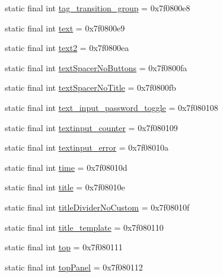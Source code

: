 \begin{DoxyCompactItemize}
\item 
static final int \mbox{\hyperlink{classandroid_1_1support_1_1design_1_1_r_1_1id_addf740e3527475a3849728232f72806a}{tag\+\_\+transition\+\_\+group}} = 0x7f0800e8
\item 
static final int \mbox{\hyperlink{classandroid_1_1support_1_1design_1_1_r_1_1id_a42faaf7f13a49213f874ef8cb4e68ee1}{text}} = 0x7f0800e9
\item 
static final int \mbox{\hyperlink{classandroid_1_1support_1_1design_1_1_r_1_1id_a65e945658c4131f7246b3447a632bccf}{text2}} = 0x7f0800ea
\item 
static final int \mbox{\hyperlink{classandroid_1_1support_1_1design_1_1_r_1_1id_a56c833c59cf9349be24f83f9e9dea560}{text\+Spacer\+No\+Buttons}} = 0x7f0800fa
\item 
static final int \mbox{\hyperlink{classandroid_1_1support_1_1design_1_1_r_1_1id_ac4df85eb99a5c88371d15995269b0cd6}{text\+Spacer\+No\+Title}} = 0x7f0800fb
\item 
static final int \mbox{\hyperlink{classandroid_1_1support_1_1design_1_1_r_1_1id_a77c3ac2414c276faa7936afbef217ab0}{text\+\_\+input\+\_\+password\+\_\+toggle}} = 0x7f080108
\item 
static final int \mbox{\hyperlink{classandroid_1_1support_1_1design_1_1_r_1_1id_a3e209a8a91205164870a6a2004def118}{textinput\+\_\+counter}} = 0x7f080109
\item 
static final int \mbox{\hyperlink{classandroid_1_1support_1_1design_1_1_r_1_1id_a2f78eeb6c053613a83de5e30874f4842}{textinput\+\_\+error}} = 0x7f08010a
\item 
static final int \mbox{\hyperlink{classandroid_1_1support_1_1design_1_1_r_1_1id_ab05973571013eeb8a42479f708d42317}{time}} = 0x7f08010d
\item 
static final int \mbox{\hyperlink{classandroid_1_1support_1_1design_1_1_r_1_1id_a15e74af9346f557351ae9e43a3ab4da1}{title}} = 0x7f08010e
\item 
static final int \mbox{\hyperlink{classandroid_1_1support_1_1design_1_1_r_1_1id_a3685419c81ad5d66fb1cef37917b8008}{title\+Divider\+No\+Custom}} = 0x7f08010f
\item 
static final int \mbox{\hyperlink{classandroid_1_1support_1_1design_1_1_r_1_1id_a9a4ba99ff46ad16c6c732490f0740ffd}{title\+\_\+template}} = 0x7f080110
\item 
static final int \mbox{\hyperlink{classandroid_1_1support_1_1design_1_1_r_1_1id_aa710ae6c7f9597ec94d2008d8a70b056}{top}} = 0x7f080111
\item 
static final int \mbox{\hyperlink{classandroid_1_1support_1_1design_1_1_r_1_1id_a7eef3c87506e53208c3243360b38242c}{top\+Panel}} = 0x7f080112

\end{DoxyCompactItemize}
